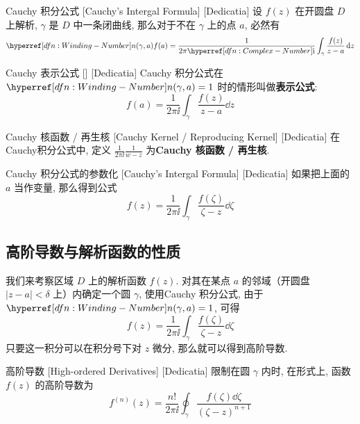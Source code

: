         \begin{thm}
            {Cauchy 积分公式}
            [Cauchy's Intergal Formula]
            [Dedicatia]
            设 \(f(z)\) 在开圆盘 \(D\) 上解析,  \(\gamma\) 是 \(D\) 中一条闭曲线, 那么对于不在 \(\gamma\) 上的点 \(a\), 必然有
            \[\Windn(\gamma,a)f(a)=\frac{1}{2\pi\ii}\int_\gamma\frac{f(z)}{z-a}\dd{z} \]
        \end{thm}

        \begin{crl}
            {Cauchy 表示公式}
            []
            [Dedicatia]
            Cauchy 积分公式在 \(\Windn(\gamma,a)=1\) 时的情形叫做\textbf{表示公式}:
            \[f(a)=\frac{1}{2\pi\ii}\int_\gamma\frac{f(z)}{z-a}\dd{z}\]
        \end{crl}

        \begin{dfn}
            {Cauchy 核函数 / 再生核}
            [Cauchy Kernel / Reproducing Kernel]
            [Dedicatia]
            在Cauchy积分公式中, 定义 $\frac{1}{2\pi\ii}\frac{1}{w-z}$ 为\textbf{Cauchy 核函数 / 再生核}.
        \end{dfn}

        \begin{crl}
            {Cauchy 积分公式的参数化}
            [Cauchy's Intergal Formula]
            [Dedicatia]
            如果把上面的 \(a\) 当作变量, 那么得到公式
            \[f(z)=\frac{1}{2\pi\ii}\int_\gamma\frac{f(\zeta)}{\zeta-z}\dd{\zeta}\]
        \end{crl}

    \subsection{高阶导数与解析函数的性质}

        我们来考察区域 \(D\) 上的解析函数 \(f(z)\). 对其在某点 \(a\) 的邻域（开圆盘 \(|z-a|<\delta\) 上）内确定一个圆 \(\gamma\), 使用Cauchy 积分公式, 由于 \(\Windn(\gamma,a)=1\), 可得
        \[f(z)=\frac{1}{2\pi\ii}\int_\gamma\frac{f(\zeta)}{\zeta-z}\dd{\zeta}\]
        只要这一积分可以在积分号下对 \(z\) 微分, 那么就可以得到高阶导数. 

        \begin{dfn}
            {高阶导数}
            [High-ordered Derivatives]
            [Dedicatia]
            限制在圆 \(\gamma\) 内时, 在形式上, 函数 \(f(z)\) 的高阶导数为
            \[f^{(n)}(z)=\frac{n!}{2\pi\ii}\oint_\gamma\frac{f(\zeta)\dd{\zeta}}{(\zeta-z)^{n+1}}\]
        \end{dfn}

